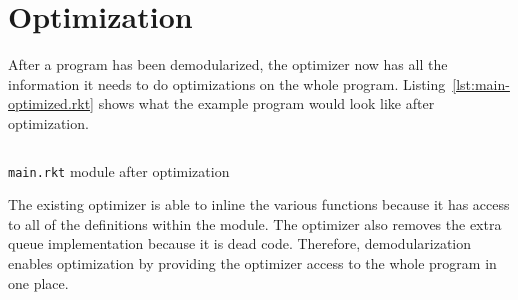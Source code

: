 \section{Optimization}

After a program has been demodularized, the optimizer now has all the information it needs to do optimizations on the whole program.
Listing~\ref{lst:main-optimized.rkt} shows what the example program would look like after optimization.

\begin{listing}
  \inputminted{racket}{listings/main-optimized.rkt}
  \caption{\texttt{main.rkt} module after optimization}
  \label{lst:main-optimized.rkt}
\end{listing}

The existing optimizer is able to inline the various functions because it has access to all of the definitions within the module.
The optimizer also removes the extra queue implementation because it is dead code.
Therefore, demodularization enables optimization by providing the optimizer access to the whole program in one place.
